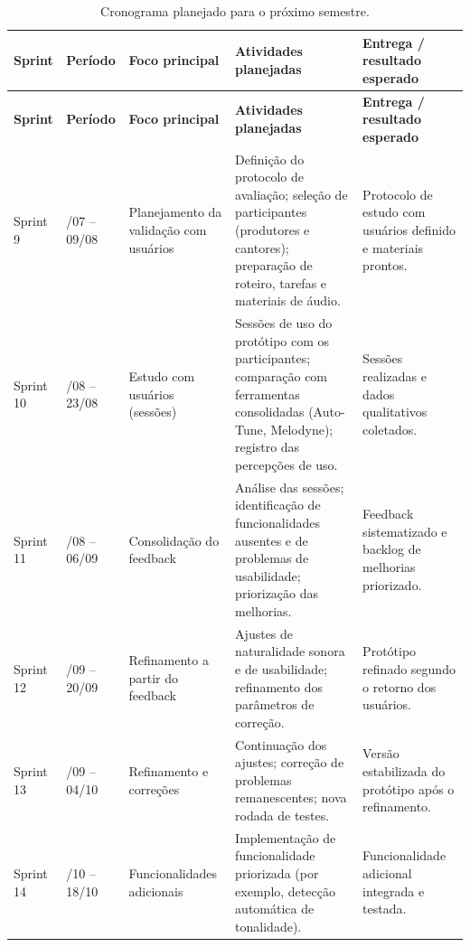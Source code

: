 \begin{longtable}{|>{\raggedright\arraybackslash}p{1.5cm}|>{\raggedright\arraybackslash}p{2.3cm}|>{\raggedright\arraybackslash}p{3.0cm}|>{\raggedright\arraybackslash}p{4.4cm}|>{\raggedright\arraybackslash}p{3.1cm}|}
\caption{\label{tab:cronograma_proximo}Cronograma planejado para o próximo semestre.}\\
\hline
\rowcolor[gray]{0.9}
\textbf{Sprint} & \textbf{Período} & \textbf{Foco principal} & \textbf{Atividades planejadas} & \textbf{Entrega / resultado esperado} \\
\hline
\endfirsthead

\hline
\rowcolor[gray]{0.9}
\textbf{Sprint} & \textbf{Período} & \textbf{Foco principal} & \textbf{Atividades planejadas} & \textbf{Entrega / resultado esperado} \\
\hline
\endhead

Sprint 9 & 27/07 -- 09/08 & Planejamento da validação com usuários &
Definição do protocolo de avaliação; seleção de participantes (produtores e cantores); preparação de roteiro, tarefas e materiais de áudio. &
Protocolo de estudo com usuários definido e materiais prontos. \\
\hline

Sprint 10 & 10/08 -- 23/08 & Estudo com usuários (sessões) &
Sessões de uso do protótipo com os participantes; comparação com ferramentas consolidadas (Auto-Tune, Melodyne); registro das percepções de uso. &
Sessões realizadas e dados qualitativos coletados. \\
\hline

Sprint 11 & 24/08 -- 06/09 & Consolidação do feedback &
Análise das sessões; identificação de funcionalidades ausentes e de problemas de usabilidade; priorização das melhorias. &
Feedback sistematizado e backlog de melhorias priorizado. \\
\hline

Sprint 12 & 07/09 -- 20/09 & Refinamento a partir do feedback &
Ajustes de naturalidade sonora e de usabilidade; refinamento dos parâmetros de correção. &
Protótipo refinado segundo o retorno dos usuários. \\
\hline

Sprint 13 & 21/09 -- 04/10 & Refinamento e correções &
Continuação dos ajustes; correção de problemas remanescentes; nova rodada de testes. &
Versão estabilizada do protótipo após o refinamento. \\
\hline

Sprint 14 & 05/10 -- 18/10 & Funcionalidades adicionais &
Implementação de funcionalidade priorizada (por exemplo, detecção automática de tonalidade). &
Funcionalidade adicional integrada e testada. \\
\hline


\end{longtable}
